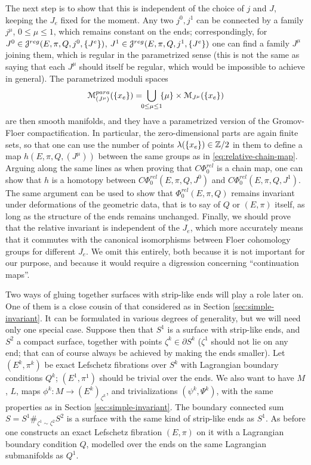 \documentclass[10pt,letterpaper]{article}
\begin{document}
The next step is to show that this is independent of the choice of $j$ and $J$,
keeping the $J_e$ fixed for the moment. Any two $j^0,j^1$ can be connected by a
family $j^\mu$, $0 \leq \mu \leq 1$, which remains constant on the ends;
correspondingly, for $J^0 \in \mathcal{J}^{reg}(E,\pi,Q,j^0,\{J^e\})$, $J^1 \in
\mathcal{J}^{reg}(E,\pi,Q,j^1,\{J^e\})$ one can find a family $J^\mu$ joining them, which
is regular in the parametrized sense (this is not the same as saying that each
$J^\mu$ should itself be regular, which would be impossible to achieve in
general). The parametrized moduli spaces
\[
\mathcal{M}^{para}_{(J^\mu)}(\{x_e\}) = \bigcup_{\!\!\! 0 \leq \mu \leq 1 \!\!\!} \,
\{\mu\} \times \mathcal{M}_{J^\mu}(\{x_e\})
\]
are then smooth manifolds, and they have a parametrized version of the
Gromov-Floer compactification. In particular, the zero-dimensional parts are
again finite sets, so that one can use the number of points $\lambda(\{x_e\})
\in \mathbb{Z}/2$ in them to define a map $h(E,\pi,Q,(J^\mu))$ between the same groups
as in \eqref{eq:relative-chain-map}. Arguing along the same lines as when
proving that $C\Phi_0^{rel}$ is a chain map, one can show that $h$ is a
homotopy between $C\Phi_0^{rel}(E,\pi,Q,J^0)$ and $C\Phi_0^{rel}(E,\pi,Q,J^1)$.
The same argument can be used to show that $\Phi_0^{rel}(E,\pi,Q)$ remains
invariant under deformations of the geometric data, that is to say of $Q$ or
$(E,\pi)$ itself, as long as the structure of the ends remains unchanged.
Finally, we should prove that the relative invariant is independent of the
$J_e$, which more accurately means that it commutes with the canonical
isomorphisms between Floer cohomology groups for different $J_e$. We omit this
entirely, both because it is not important for our purpose, and because it
would require a digression concerning ``continuation maps''.

Two ways of gluing together surfaces with strip-like ends will play a role
later on. One of them is a close cousin of that considered as in Section
\ref{sec:simple-invariant}. It can be formulated in various degrees of
generality, but we will need only one special case. Suppose then that $S^1$ is
a surface with strip-like ends, and $S^2$ a compact surface, together with
points $\zeta^k \in \partial S^k$ ($\zeta^1$ should not lie on any end; that
can of course always be achieved by making the ends smaller). Let $(E^k,\pi^k)$
be exact Lefschetz fibrations over $S^k$ with Lagrangian boundary conditions
$Q^k$; $(E^1,\pi^1)$ should be trivial over the ends. We also want to have $M$,
$L$, maps $\phi^k: M \rightarrow (E^k)_{\zeta^k}$, and trivializations
$(\psi^k,\Psi^k)$, with the same properties as in Section
\ref{sec:simple-invariant}. The boundary connected sum $S = S^1 \#_{\zeta^1
\sim \zeta^2} S^2$ is a surface with the same kind of strip-like ends as $S^1$.
As before one constructs an exact Lefschetz fibration $(E,\pi)$ on it with a
Lagrangian boundary condition $Q$, modelled over the ends on the same
Lagrangian submanifolds as $Q^1$.
\end{document}
